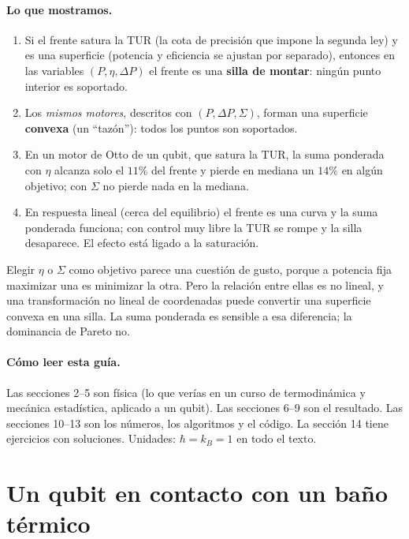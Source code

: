\paragraph{Lo que mostramos.}
\begin{enumerate}
\item Si el frente satura la TUR (la cota de precisión que impone la segunda ley) y es una superficie
  (potencia y eficiencia se ajustan por separado), entonces en las variables $(P,\eta,\Delta P)$ el
  frente es una \textbf{silla de montar}: ningún punto interior es soportado.
\item Los \emph{mismos motores}, descritos con $(P,\Delta P,\Sigma)$, forman una superficie
  \textbf{convexa} (un ``tazón''): todos los puntos son soportados.
\item En un motor de Otto de un qubit, que satura la TUR, la suma ponderada con $\eta$ alcanza solo
  el $11\%$ del frente y pierde en mediana un $14\%$ en algún objetivo; con $\Sigma$ no pierde nada en
  la mediana.
\item En respuesta lineal (cerca del equilibrio) el frente es una curva y la suma ponderada funciona;
  con control muy libre la TUR se rompe y la silla desaparece. El efecto está ligado a la saturación.
\end{enumerate}

\begin{idea}
Elegir $\eta$ o $\Sigma$ como objetivo parece una cuestión de gusto, porque a potencia fija
maximizar una es minimizar la otra. Pero la relación entre ellas es no lineal, y una
transformación no lineal de coordenadas puede convertir una superficie convexa en una silla. La
suma ponderada es sensible a esa diferencia; la dominancia de Pareto no.
\end{idea}

\paragraph{Cómo leer esta guía.} Las secciones 2--5 son física (lo que verías en un curso de
termodinámica y mecánica estadística, aplicado a un qubit). Las secciones 6--9 son el resultado. Las
secciones 10--13 son los números, los algoritmos y el código. La sección 14 tiene ejercicios con
soluciones. Unidades: $\hbar = k_B = 1$ en todo el texto.

\section{Un qubit en contacto con un baño térmico}

